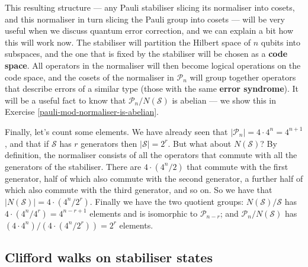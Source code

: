 \documentclass[fleqn,a4paper]{article}
\theoremstyle{definition}
\theoremstyle{definition}
\theoremstyle{definition}
\theoremstyle{definition}
\theoremstyle{remark}
\begin{document}
This resulting structure --- any Pauli stabiliser slicing its normaliser into cosets, and this normaliser in turn slicing the Pauli group into cosets --- will be very useful when we discuss quantum error correction, and we can explain a bit how this will work now.
The stabiliser will partition the Hilbert space of \(n\) qubits into subspaces, and the one that is fixed by the stabiliser will be chosen as a \textbf{code space}.
All operators in the normaliser will then become logical operations on the code space, and the cosets of the normaliser in \(\mathcal{P}_n\) will group together operators that describe errors of a similar type (those with the same \textbf{error syndrome}).
It will be a useful fact to know that \(\mathcal{P}_n/N(\mathcal{S})\) is abelian --- we show this in Exercise \ref{pauli-mod-normaliser-is-abelian}.

Finally, let's count some elements.
We have already seen that \(|\mathcal{P}_n|=4\cdot 4^n=4^{n+1}\), and that if \(\mathcal{S}\) has \(r\) generators then \(|\mathcal{S}|=2^r\).
But what about \(N(\mathcal{S})\)?
By definition, the normaliser consists of all the operators that commute with all the generators of the stabiliser.
There are \(4\cdot(4^n/2)\) that commute with the first generator, half of which also commute with the second generator, a further half of which also commute with the third generator, and so on.
So we have that \(|N(\mathcal{S})|=4\cdot(4^n/2^r)\).
Finally we have the two quotient groups: \(N(\mathcal{S})/\mathcal{S}\) has \(4\cdot(4^n/4^r)=4^{n-r+1}\) elements and is isomorphic to \(\mathcal{P}_{n-r}\); and \(\mathcal{P}_n/N(\mathcal{S})\) has \((4\cdot4^n)/(4\cdot(4^n/2^r))=2^r\) elements.

\hypertarget{clifford-walks-on-stabiliser-states}{%
\subsection{Clifford walks on stabiliser states}\label{clifford-walks-on-stabiliser-states}}
\end{document}
